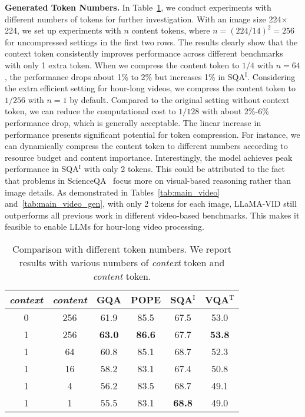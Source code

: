 \vspace{1.0em}
\noindent
\textbf{Generated Token Numbers.}
In Table~\ref{tab:abla_token_num}, we conduct experiments with different numbers of tokens for further investigation.
With an image size 224$\times$224, we set up experiments with $n$ content tokens, where $n=(224/14)^2=256$ for uncompressed settings in the first two rows.
The results clearly show that the context token consistently improves performance across different benchmarks with only 1 extra token.
When we compress the content token to $1/4$ with $n=64$, the performance drops about 1\% to 2\% but increases 1\% in SQA$^\text{I}$. 
Considering the extra efficient setting for hour-long videos, we compress the content token to $1/256$ with $n=1$ by default.
Compared to the original setting without context token, we can reduce the computational cost to $1/128$ with about 2\%-6\% performance drop, which is generally acceptable.
The linear increase in performance presents significant potential for token compression.
For instance, we can dynamically compress the content token to different numbers according to resource budget and content importance.
Interestingly, the model achieves peak performance in SQA$^\text{I}$ with only 2 tokens.
This could be attributed to the fact that problems in ScienceQA~\cite{scienceqa} focus more on visual-based reasoning rather than image details.
As demonstrated in Tables~\ref{tab:main_video} and~\ref{tab:main_video_gen}, with only 2 tokens for each image, LLaMA-VID still outperforms all previous work in different video-based benchmarks.
This makes it feasible to enable LLMs for hour-long video processing.

\begin{table}[t]
 \centering
\begin{tabular}{cc|cccc}
  \toprule
  {\em context} & {\em content} & {\bf GQA}  & {\bf POPE} & {\bf SQA$^\text{I}$} & {\bf VQA$^\text{T}$} \\
  \midrule
  0 & 256 & 61.9 & 85.5 & 67.5 & 53.0 \\
  \midrule
  1 & 256 & {\bf 63.0} & {\bf 86.6} & 67.7 & {\bf 53.8} \\
  1 & 64 & 60.8 & 85.1 & 68.7 & 52.3 \\
  1 & 16 & 58.2  & 83.1 & 67.4 & 50.8 \\
  1 & 4 & 56.2  & 83.5 & 68.7 & 49.1 \\
  \rowcolor{mygray}
  1 & 1 & 55.5  & 83.1 & {\bf 68.8} & 49.0 \\

  \bottomrule
\end{tabular}
 \caption{Comparison with different token numbers.
We report results with various numbers of {\em context} token and {\em content} token.
 }
 \label{tab:abla_token_num}
\end{table}

